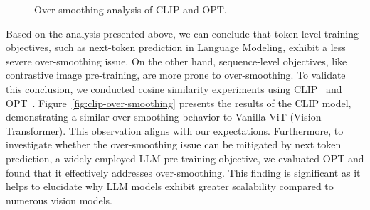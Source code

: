 \documentclass{article}
\theoremstyle{plain}
\theoremstyle{definition}
\theoremstyle{remark}
\begin{document}
\begin{figure}[t]
\centering
{}\vspace{-0.4cm}
\vspace{-0.35cm}
\caption{Over-smoothing analysis of CLIP and OPT.}
\label{fig:clip-opt-over-smoothing}
\vspace{-0.4cm}
\end{figure}



Based on the analysis presented above, we can conclude that token-level training objectives, such as next-token prediction in Language Modeling, exhibit a less severe over-smoothing issue. On the other hand, sequence-level objectives, like contrastive image pre-training, are more prone to over-smoothing. To validate this conclusion, we conducted cosine similarity experiments using CLIP~\citep{radford2021learning} and OPT~\cite{zhang2022opt}.
Figure~\ref{fig:clip-over-smoothing} presents the results of the CLIP model, demonstrating a similar over-smoothing behavior to Vanilla ViT (Vision Transformer). This observation aligns with our expectations. Furthermore, to investigate whether the over-smoothing issue can be mitigated by next token prediction, a widely employed LLM pre-training objective, we evaluated OPT and found that it effectively addresses over-smoothing. This finding is significant as it helps to elucidate why LLM models exhibit greater scalability compared to numerous vision models.
\end{document}

